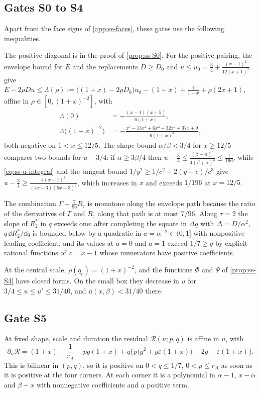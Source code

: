 \subsection{Gates S0 to S4}\label{app:ss-S0-S4}

Apart from the face signs of \cref{app:ss-faces}, these gates use the following inequalities.

 The positive diagonal is in the proof of \cref{prop:ss-S0}. For the positive
pairing, the envelope bound for $E$ and the replacements $D\ge D_0$ and
$u\le u_0=\frac34+\frac{(x-1)^2}{12(x+1)^2}$ give
$E-2\rho Du\le\Lambda(\rho):=\bigl((1+x)-2\rho D_0\bigr)u_0-(1+x)+\frac1{1+x}+\rho(2x+1)$, affine
in $\rho\in[0,(1+x)^{-2}]$, with
\begin{align*}
  \Lambda(0)&=-\frac{(x-1)(x+5)}{6(1+x)},\\
  \Lambda\bigl((1+x)^{-2}\bigr)&=-\frac{x^5-13x^4+6x^3+32x^2+37x+9}{6(1+x)^4},
\end{align*}
both negative on $1<x\le12/5$. The shape bound $\alpha/\beta<3/4$ for $x\ge12/5$ compares two
bounds for $u-3/4$: if $\alpha\ge3\beta/4$ then
$u-\frac34\le\frac{(\beta-\alpha)^2}{4(\beta+\alpha)^2}\le\frac1{196}$, while
\eqref{eq:ss-u-integral} and the tangent bound $1/y^2\ge1/c^2-2(y-c)/c^3$ give
$u-\frac34\ge\frac{4(x-1)^3}{(4x-3)(5x+3)^2}$, which increases in $x$ and exceeds $1/196$ at
$x=12/5$.

 The combination $\Gamma-\frac{7}{96}R_\tau$ is monotone along the envelope path
because the ratio of the derivatives of $\Gamma$ and $R_\tau$ along that path is at most $7/96$.
Along $\tau=2$ the slope of $R^*_2$ in $q$ exceeds one: after completing the square in $\Delta q$
with $\Delta=D/\alpha^2$, $q\,\dd R^*_2/\dd q$ is bounded below by a quadratic in
$a=\alpha^{-2}\in(0,1]$ with nonpositive leading coefficient, and its values at $a=0$ and $a=1$
exceed $1/7\ge q$ by explicit rational functions of $z=x-1$ whose numerators have positive
coefficients.

 At the central scale, $\rho(q_c)=(1+x)^{-2}$, and the functions $\Phi$ and $\Psi$
of \cref{prop:ss-S4} have closed forms. On the small box they decrease in $u$ for
$3/4\le u\le u'\le31/40$, and $\bar u(x,\beta)<31/40$ there.

\subsection{Gate S5}\label{app:ss-S5}

 At fixed shape, scale and duration the residual
$\mathcal R(u;p,q)$ is affine in $u$, with
\[
  \partial_u\mathcal R=(1+x)+\frac1{r_A}-pg(1+x)+q\bigl\{p\bigl(g^2+g\varepsilon(1+x)\bigr)-2g
  -\varepsilon(1+x)\bigr\}.
\]
This is bilinear in $(p,q)$, so it is positive on $0<q\le1/7$, $0<p\le r_A$ as soon as it is
positive at the four corners. At each corner it is a polynomial in $\alpha-1$, $x-\alpha$ and
$\beta-x$ with nonnegative coefficients and a positive term.

